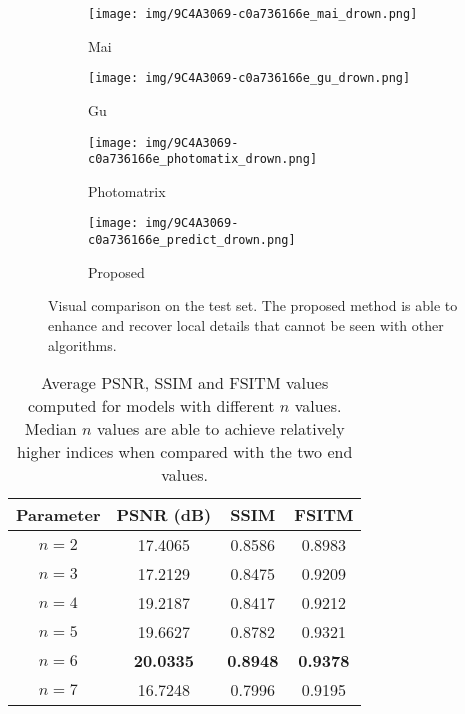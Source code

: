 \documentclass[journal]{IEEEtran}
\begin{document}
\begin{figure*}[tb]
        \centering
        \begin{subfigure}[b]{0.245\textwidth}
            \centering
            \texttt{[image: img/9C4A3069-c0a736166e\_mai\_drown.png]}
            \caption[]%
            {{\small Mai \cite{mai2011optimizing} }}    
            \label{fig:mean and std of net14}
        \end{subfigure}
        \begin{subfigure}[b]{0.245\textwidth}
            \centering
            \texttt{[image: img/9C4A3069-c0a736166e\_gu\_drown.png]}
            \caption[]%
            {{\small Gu \cite{gu2013local} }}    
            \label{fig:mean and std of net14}
        \end{subfigure}
        \begin{subfigure}[b]{0.245\textwidth}   
            \centering 
            \texttt{[image: img/9C4A3069-c0a736166e\_photomatix\_drown.png]}
            \caption[]%
            {{\small Photomatrix \cite{photomatrix} }}    
            \label{fig:mean and std of net34}
        \end{subfigure}
        \begin{subfigure}[b]{0.245\textwidth}   
            \centering 
            \texttt{[image: img/9C4A3069-c0a736166e\_predict\_drown.png]}
            \caption[]%
            {{\small Proposed  }}    
            \label{fig:mean and std of net44}
        \end{subfigure}
        \caption{Visual comparison on the test set. The proposed method is able to enhance and recover local details that cannot be seen with other algorithms.}
        \label{fig:Laval_database_result}
\end{figure*} 


\begin{table}[tb]
\footnotesize
\begin{center}
\caption{Average PSNR, SSIM and FSITM values computed for models with different $n$ values. Median $n$ values are able to achieve relatively higher indices when compared with the two end values.}
\begin{tabular}{c|c|c|c}
\hline
Parameter & PSNR (dB) & SSIM  &FSITM\\ \hline
     $n  = 2$       &  17.4065  & 0.8586  & 0.8983\\
     $n  = 3$       &  17.2129  & 0.8475  & 0.9209\\
     $n  = 4$       &  19.2187  & 0.8417  & 0.9212\\
     $n  = 5$       &  19.6627  & 0.8782  & 0.9321\\
     $n  = 6$       &  \textbf{20.0335}  & \textbf{0.8948}  & \textbf{0.9378}\\
     $n  = 7$       &  16.7248  & 0.7996  & 0.9195\\ \hline
\end{tabular}
\label{table:PSNR}
\end{center}
\end{table}
\end{document}
